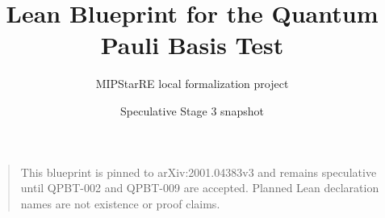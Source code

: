 \documentclass[11pt]{article}
\title{Lean Blueprint for the Quantum Pauli Basis Test}
\author{MIPStarRE local formalization project}
\date{Speculative Stage 3 snapshot}
\begin{document}
\maketitle
\begin{quote}
This blueprint is pinned to arXiv:2001.04383v3 and remains speculative until
QPBT-002 and QPBT-009 are accepted. Planned Lean declaration names are not
existence or proof claims.
\end{quote}
\tableofcontents












\end{document}
